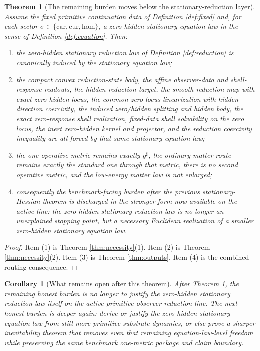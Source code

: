 \documentclass[11pt]{article}
\newcommand{\CompletedMetric}{g^{\sharp}}
\newcommand{\Car}{\mathrm{car}}
\newcommand{\Cur}{\mathrm{cur}}
\newcommand{\Hom}{\mathrm{hom}}
\newtheorem{corollary}{Corollary}
\newtheorem{theorem}{Theorem}
\begin{document}
\begin{theorem}[The remaining burden moves below the stationary-reduction layer]
\label{thm:main}
Assume the fixed primitive continuation data of Definition \ref{def:fixed} and, for each sector \(\sigma\in\{\Car,\Cur,\Hom\}\), a zero-hidden stationary equation law in the sense of Definition \ref{def:equation}. Then:
\begin{enumerate}
    \item the zero-hidden stationary reduction law of Definition \ref{def:reduction} is canonically induced by the stationary equation law;
    \item the compact convex reduction-state body, the affine observer-data and shell-response readouts, the hidden reduction target, the smooth reduction map with exact zero-hidden locus, the common zero-locus linearization with hidden-direction coercivity, the induced zero/hidden splitting and hidden body, the exact zero-response shell realization, fixed-data shell solvability on the zero locus, the inert zero-hidden kernel and projector, and the reduction coercivity inequality are all forced by that same stationary equation law;
    \item the one operative metric remains exactly \(\CompletedMetric\), the ordinary matter route remains exactly the standard one through that metric, there is no second operative metric, and the low-energy matter law is not enlarged;
    \item consequently the benchmark-facing burden after the previous stationary-Hessian theorem is discharged in the stronger form now available on the active line: the zero-hidden stationary reduction law is no longer an unexplained stopping point, but a necessary Euclidean realization of a smaller zero-hidden stationary equation law.
\end{enumerate}
\end{theorem}

\begin{proof}
Item (1) is Theorem \ref{thm:necessity}(1). Item (2) is Theorem \ref{thm:necessity}(2). Item (3) is Theorem \ref{thm:outputs}. Item (4) is the combined routing consequence.
\end{proof}

\begin{corollary}[What remains open after this theorem]
\label{cor:next}
After Theorem \ref{thm:main}, the remaining honest burden is no longer to justify the zero-hidden stationary reduction law itself on the active primitive-observer-reduction line. The next honest burden is deeper again: derive or justify the zero-hidden stationary equation law from still more primitive substrate dynamics, or else prove a sharper inevitability theorem that removes even that remaining equation-law-level freedom while preserving the same benchmark one-metric package and claim boundary.
\end{corollary}
\end{document}
